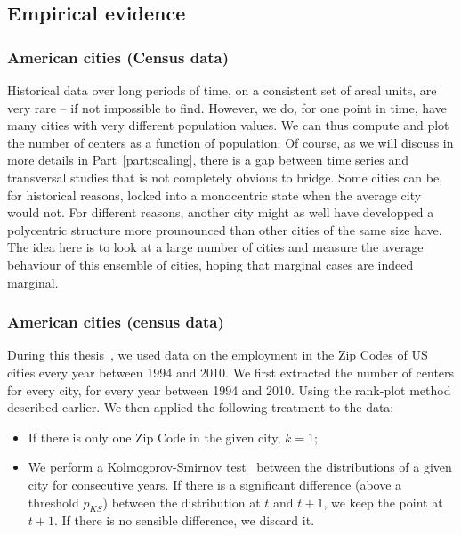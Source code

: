 \subsection{Empirical evidence}
\label{sub:empirical_evidence}

\subsubsection{American cities (Census data)}
\label{ssub:american_cities_census_data_}

Historical data over long periods of time, on a consistent set of areal units,
are very rare -- if not impossible to find. However, we do, for one point in
time, have many cities with very different population values. We can thus compute
and plot the number of centers as a function of population. Of course, as we
will discuss in more details in Part~\ref{part:scaling}, there is a gap between
time series and transversal studies that is not completely obvious to
bridge. Some cities can be, for historical reasons, locked into a monocentric
state when the average city would not. For different reasons, another city
might as well have developped a polycentric structure more prounounced than
other cities of the same size have. The idea here is to look at a large number
of cities and measure the average behaviour of this ensemble of cities, hoping
that marginal cases are indeed marginal.


\subsubsection{American cities (census data)}
\label{ssub:american_cities_census_data_}

During this thesis~\cite{Louf:2013_polycentric}, we used data on the employment in the Zip Codes of US cities
every year between 1994 and 2010. We first extracted the number of
centers for every city, for every year between 1994 and 2010. Using the
rank-plot method described earlier. We then applied the following treatment to
the data:

\begin{itemize}
    \item If there is only one Zip Code in the given city, $k=1$;
    \item We perform a Kolmogorov-Smirnov test~\cite{Massey:1951} between the
        distributions of a given city for consecutive years. If there is a
        significant difference (above a threshold $p_{KS}$) between the
        distribution at $t$ and $t+1$, we keep the point at $t+1$. If there is
        no sensible difference, we discard it.
\end{itemize}

